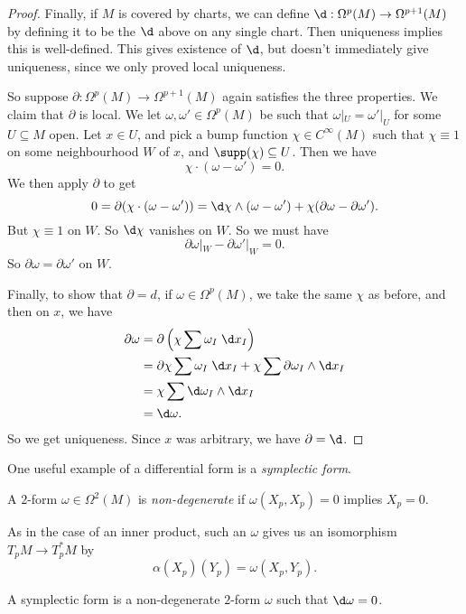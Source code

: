 \documentclass[a4paper]{article}
\begin{document}
\begin{proof}
  Finally, if $M$ is covered by charts, we can define $\d: \Omega^p(M) \to \Omega^{p + 1}(M)$ by defining it to be the $\d$ above on any single chart. Then uniqueness implies this is well-defined. This gives existence of $\d$, but doesn't immediately give uniqueness, since we only proved local uniqueness.

  So suppose $\partial: \Omega^p(M) \to \Omega^{p + 1}(M)$ again satisfies the three properties. We claim that $\partial$ is local. We let $\omega, \omega' \in \Omega^p(M)$ be such that $\omega|_U = \omega'|_U$ for some $U \subseteq M$ open. Let $x \in U$, and pick a bump function $\chi \in C^\infty(M)$ such that $\chi \equiv 1$ on some neighbourhood $W$ of $x$, and $\supp(\chi) \subseteq U$. Then we have
  \[
    \chi \cdot (\omega - \omega') = 0.
  \]
  We then apply $\partial$ to get
  \[
    0 = \partial(\chi \cdot(\omega - \omega')) = \d \chi \wedge (\omega - \omega') + \chi(\partial \omega - \partial\omega').
  \]
  But $\chi \equiv 1$ on $W$. So $\d \chi$ vanishes on $W$. So we must have
  \[
    \partial \omega|_W - \partial \omega'|_W = 0.
  \]
  So $\partial \omega = \partial \omega'$ on $W$.

  Finally, to show that $\partial = d$, if $\omega \in \Omega^p(M)$, we take the same $\chi$ as before, and then on $x$, we have
  \begin{align*}
    \partial \omega &= \partial\left(\chi\sum \omega_I \;\d x_I\right) \\
    &= \partial \chi \sum \omega_I \;\d x_I + \chi \sum \partial \omega_I \wedge \d x_I \\
    &= \chi \sum \d \omega_I \wedge \d x_I\\
    &= \d \omega.
  \end{align*}
  So we get uniqueness. Since $x$ was arbitrary, we have $\partial = \d$.
\end{proof}

One useful example of a differential form is a \emph{symplectic form}.
\begin{defi}
  A $2$-form $\omega \in \Omega^2(M)$ is \emph{non-degenerate} if $\omega(X_p, X_p) = 0$ implies $X_p = 0$.
\end{defi}
As in the case of an inner product, such an $\omega$ gives us an isomorphism $T_p M \to T^*_p M$ by
\[
  \alpha(X_p)(Y_p) = \omega(X_p, Y_p).
\]
\begin{defi}
  A symplectic form is a non-degenerate $2$-form $\omega$ such that $\d \omega = 0$.
\end{defi}
\end{document}
